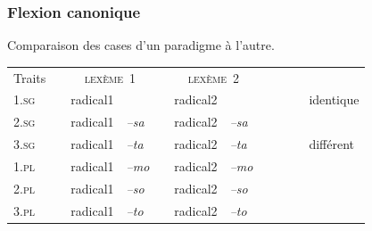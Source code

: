 \begin{frame}
\frametitle{Flexion canonique}
Comparaison des cases d'un paradigme à l'autre.

\scriptsize

\begin{table}
\begin{tabular}{|l| p{1mm}|ll|p{1mm}|ll|p{1mm}cl}
\cline{1-1}\cline{3-4}\cline{6-7}
Traits&&\multicolumn{2}{|c|}{\cellcolor{white}\textsc{ lexème~1}}&&\multicolumn{2}{|c|}{\cellcolor{white}\textsc{ lexème~2}}&&\\
\cline{1-1}\cline{3-4}\cline{6-7}
\textsc{1.sg}&& \cellcolor{mandarine}radical1& \cellcolor{ciel}{\em --ma}&&\cellcolor{mandarine}radical2& \cellcolor{ciel}{\em
  --ma}&&\cellcolor{ciel}~~~&identique\\
\cline{1-1}\cline{3-4}\cline{6-7}
\textsc{2.sg}& &radical1&{\em --sa}&&radical2& {\em --sa}&&&\\
\cline{1-1}\cline{3-4}\cline{6-7}

\textsc{3.sg}&& radical1&{\em --ta}&&radical2& {\em
  --ta}&&\cellcolor{mandarine}&différent\\
\cline{1-1}\cline{3-4}\cline{6-7}
\textsc{1.pl}&&radical1& {\em --mo}&&radical2& {\em --mo}&&\\
\cline{1-1}\cline{3-4}\cline{6-7}
\textsc{2.pl}&&radical1& {\em --so}&&radical2& {\em --so}&&\\
\cline{1-1}\cline{3-4}\cline{6-7}
\textsc{3.pl}&&radical1& {\em --to}&&radical2& {\em --to}&&\\
\cline{1-1}\cline{3-4}\cline{6-7}
\end{tabular}\\[1mm]
\end{table}
\end{frame}


